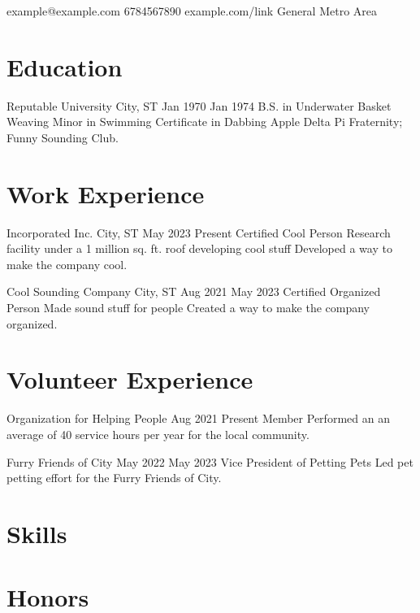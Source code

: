 \documentclass{resume}
\begin{document}
\contact
    {example@example.com} %
    {6784567890} %
    {example.com/link} %
    {General Metro Area} %

\section{Education}
\education
    {Reputable University} %
    {City, ST} %
    {Jan 1970} %
    {Jan 1974} %
    {B.S. in Underwater Basket Weaving} %
    {Minor in Swimming} %
    {Certificate in Dabbing} %
    {Apple Delta Pi Fraternity; Funny Sounding Club.} %

\section{Work Experience}
\work
    {Incorporated Inc.} %
    {City, ST} %
    {May 2023} %
    {Present} %
    {Certified Cool Person} %
    {Research facility under a 1 million sq. ft. roof developing cool stuff} %
    { %
        \newitem Developed a way to make the company cool.
    }

\work
    {Cool Sounding Company}
    {City, ST}
    {Aug 2021}
    {May 2023}
    {Certified Organized Person}
    {Made sound stuff for people}
    {
        \newitem Created a way to make the company organized.
    }

\section{Volunteer Experience}
\volunteer
    {Organization for Helping People} %
    {Aug 2021} %
    {Present} %
    {Member} %
    { %
        \newitem Performed an an average of 40 service hours per year for the local community.
    }

\volunteer
    {Furry Friends of City}
    {May 2022}
    {May 2023}
    {Vice President of Petting Pets}
    {
        \newitem Led pet petting effort for the Furry Friends of City.
    }

\section{Skills}

\section{Honors}
\end{document}
